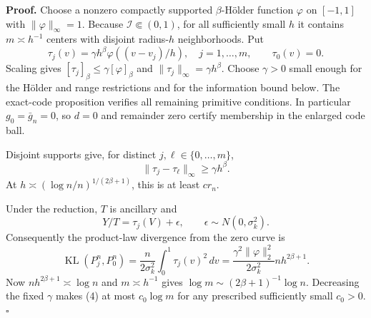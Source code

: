 \textbf{Proof.}
Choose a nonzero compactly supported \(\beta\)-H\"older function \(\varphi\) on \([-1,1]\) with \(\|\varphi\|_\infty=1\). Because \(\mathcal I\Subset(0,1)\), for all sufficiently small \(h\) it contains \(m\asymp h^{-1}\) centers with disjoint radius-\(h\) neighborhoods. Put
\[
 \tau_j(v)=\gamma h^\beta\varphi((v-v_j)/h),
 \quad j=1,\ldots,m,\qquad \tau_0(v)=0. \tag{1}
\]
Scaling gives \([\tau_j]_\beta\le\gamma[\varphi]_\beta\) and \(\|\tau_j\|_\infty=\gamma h^\beta\). Choose \(\gamma>0\) small enough for the H\"older and range restrictions and for the information bound below. The exact-code proposition verifies all remaining primitive conditions. In particular \(g_0=\bar g_n=0\), so \(d=0\) and remainder zero certify membership in the enlarged code ball.

Disjoint supports give, for distinct \(j,\ell\in\{0,\ldots,m\}\),
\[
 \|\tau_j-\tau_\ell\|_\infty\ge\gamma h^\beta. \tag{2}
\]
At \(h\asymp(\log n/n)^{1/(2\beta+1)}\), this is at least \(cr_n\).

Under the reduction, \(T\) is ancillary and
\[
 Y/T=\tau_j(V)+\epsilon,\qquad
 \epsilon\sim N(0,\sigma_k^2). \tag{3}
\]
Consequently the product-law divergence from the zero curve is
\[
 \operatorname{KL}(P_j^n,P_0^n)
 =\frac{n}{2\sigma_k^2}\int_0^1\tau_j(v)^2\,dv
 =\frac{\gamma^2\|\varphi\|_2^2}{2\sigma_k^2}
 nh^{2\beta+1}. \tag{4}
\]
Now \(nh^{2\beta+1}\asymp\log n\) and \(m\asymp h^{-1}\) gives \(\log m\sim(2\beta+1)^{-1}\log n\). Decreasing the fixed \(\gamma\) makes (4) at most \(c_0\log m\) for any prescribed sufficiently small \(c_0>0\). \(\square\)